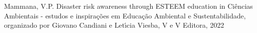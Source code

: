 \documentclass[
12pt,		%
openright,	%
twoside,  %
a4paper,			%
chapter=TITLE,		%
english,			%
french,				%
spanish,			%
brazil				%
]{USPSC-classe/USPSC}
\begin{document}
\begin{flushleft}
\begin{flushleft}
\begin{flushleft}
\begin{flushleft}
\begin{flushleft}
\begin{flushleft}
\begin{flushleft}
\begin{flushleft}
\begin{flushleft}
\begin{flushleft}
[MAMMANA et al., 2022a] Mammana, V.P. Disaster risk awareness through ESTEEM education in Ci\^encias Ambientais - estudos e inspira\c{c}\~oes em Educa\c{c}\~ao Ambiental e Sustentabilidade, organizado por Giovano Candiani e Let\'{\i}cia Viesba, V e V Editora, 2022
\end{flushleft}


\end{flushleft}


\end{flushleft}


\end{flushleft}


\end{flushleft}


\end{flushleft}


\end{flushleft}


\end{flushleft}


\end{flushleft}


\end{flushleft}
\end{document}
